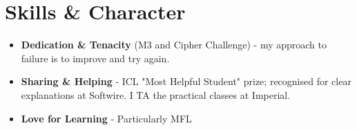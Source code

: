 \documentclass{Resume}
\begin{document}
    \section{Skills \& Character}
        \begin{itemize}
            \item \textbf{Dedication \& Tenacity} (M3 and Cipher Challenge) - my approach to failure is to improve and try again.
            \item \textbf{Sharing \& Helping} - ICL "Most Helpful Student" prize; recognised for clear explanations at Softwire. I TA the practical classes at Imperial.
            \item \textbf{Love for Learning} - Particularly MFL
        \end{itemize}
        
\end{document}

